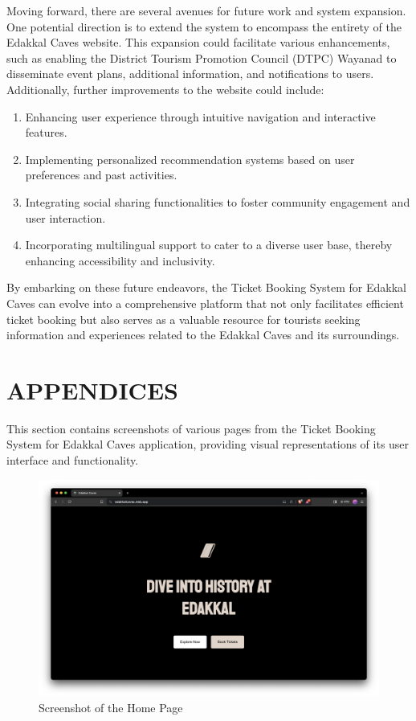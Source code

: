 \documentclass[12pt,a4paper]{report}
\begin{document}
Moving forward, there are several avenues for future work and system expansion. One potential direction is to extend the system to encompass the entirety of the Edakkal Caves website. This expansion could facilitate various enhancements, such as enabling the District Tourism Promotion Council (DTPC) Wayanad to disseminate event plans, additional information, and notifications to users. Additionally, further improvements to the website could include:
\begin{enumerate}
    \item Enhancing user experience through intuitive navigation and interactive features.
    \item Implementing personalized recommendation systems based on user preferences and past activities.
    \item Integrating social sharing functionalities to foster community engagement and user interaction.
    \item Incorporating multilingual support to cater to a diverse user base, thereby enhancing accessibility and inclusivity.
\end{enumerate}

By embarking on these future endeavors, the Ticket Booking System for Edakkal Caves can evolve into a comprehensive platform that not only facilitates efficient ticket booking but also serves as a valuable resource for tourists seeking information and experiences related to the Edakkal Caves and its surroundings.

\newpage
{}
\setcounter{page}{6}
\nocite{*}


\chapter*{APPENDICES}
\setcounter{page}{7}
\renewcommand{\thesection}{\Alph{section}}

This section contains screenshots of various pages from the Ticket Booking System for Edakkal Caves application, providing visual representations of its user interface and functionality.


\begin{figure}[htbp]
    \centering
    \includegraphics[width=1\textwidth]{screenshots/Home.png}
    \caption{Screenshot of the Home Page}
\end{figure}
\end{document}
